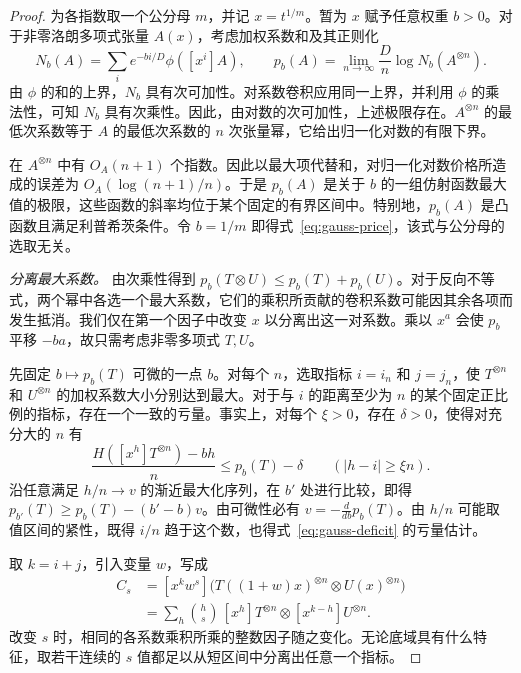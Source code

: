 \begin{proof}
为各指数取一个公分母 $m$，并记 $x=t^{1/m}$。暂为 $x$ 赋予任意权重 $b>0$。对于非零洛朗多项式张量 $A(x)$，考虑加权系数和及其正则化
\[
 N_b(A)=\sum_i e^{-bi/D}\phi([x^i]A),
 \qquad
 p_b(A)=\lim_{n\to\infty}\frac Dn\log N_b(A^{\otimes n}).
\]
由 $\phi$ 的和的上界，$N_b$ 具有次可加性。对系数卷积应用同一上界，并利用 $\phi$ 的乘法性，可知 $N_b$ 具有次乘性。因此，由对数的次可加性，上述极限存在。$A^{\otimes n}$ 的最低次系数等于 $A$ 的最低次系数的 $n$ 次张量幂，它给出归一化对数的有限下界。

在 $A^{\otimes n}$ 中有 $O_A(n+1)$ 个指数。因此以最大项代替和，对归一化对数价格所造成的误差为 $O_A(\log(n+1)/n)$。于是 $p_b(A)$ 是关于 $b$ 的一组仿射函数最大值的极限，这些函数的斜率均位于某个固定的有界区间中。特别地，$p_b(A)$ 是凸函数且满足利普希茨条件。令 $b=1/m$ 即得式~\eqref{eq:gauss-price}，该式与公分母的选取无关。

\smallskip\noindent\emph{分离最大系数。}
由次乘性得到 $p_b(T\otimes U)\le p_b(T)+p_b(U)$。对于反向不等式，两个幂中各选一个最大系数，它们的乘积所贡献的卷积系数可能因其余各项而发生抵消。我们仅在第一个因子中改变 $x$ 以分离出这一对系数。乘以 $x^a$ 会使 $p_b$ 平移 $-ba$，故只需考虑非零多项式 $T,U$。

先固定 $b\mapsto p_b(T)$ 可微的一点 $b$。对每个 $n$，选取指标 $i=i_n$ 和 $j=j_n$，使 $T^{\otimes n}$ 和 $U^{\otimes n}$ 的加权系数大小分别达到最大。对于与 $i$ 的距离至少为 $n$ 的某个固定正比例的指标，存在一个一致的亏量。事实上，对每个 $\xi>0$，存在 $\delta>0$，使得对充分大的 $n$ 有
\begin{equation}\label{eq:gauss-deficit}
 \frac{H([x^h]T^{\otimes n})-bh}{n}
   \le p_b(T)-\delta \qquad (|h-i|\ge \xi n).
\end{equation}
沿任意满足 $h/n\to v$ 的渐近最大化序列，在 $b'$ 处进行比较，即得 $p_{b'}(T)\ge p_b(T)-(b'-b)v$。由可微性必有 $v=-\frac{d}{db}p_b(T)$。由 $h/n$ 可能取值区间的紧性，既得 $i/n$ 趋于这个数，也得式~\eqref{eq:gauss-deficit} 的亏量估计。

取 $k=i+j$，引入变量 $w$，写成
\[
\begin{aligned}
 C_s
 &= [x^k w^s]\bigl(T((1+w)x)^{\otimes n}\otimes U(x)^{\otimes n}\bigr)\\
 &= \sum_h \binom hs\, [x^h]T^{\otimes n}\otimes[x^{k-h}]U^{\otimes n}.
\end{aligned}
\]
改变 $s$ 时，相同的各系数乘积所乘的整数因子随之变化。无论底域具有什么特征，取若干连续的 $s$ 值都足以从短区间中分离出任意一个指标。


\end{proof}
